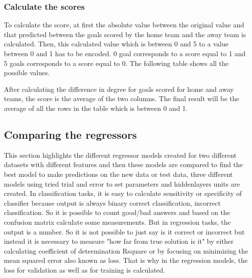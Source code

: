 \subsubsection{Calculate the scores}

To calculate the score, at first the absolute value between the original value 
and that predicted between the goals scored by the home team and the away team is calculated.
Then, this calculated value which is between 0 and 5 to a value between 0 and 1 has to be encoded. 
0 goal corresponds to a score equal to 1 and 5 goals corresponds to a score equal to 0.
The following table shows all the possible values.


\begin{table}[H]
    \centering
    \caption{Calculate the degree difference}
    \label{table:qualitycriteriaround}
\end{table}

After calculating the difference in degree for goals scored for home and away teams, the score is the average of the two columns. The final result will be the average of all the rows in the table which is between 0 and 1.

\subsection{Comparing the regressors}
This section highlights the different regressor models created for two different datasets with different features and then these models are compared to find the best model to make predictions on the new data or test data, three different models using tried trial and error to set parameters and hiddenlayers units are created.\newline 
In classification tasks, it is easy to calculate sensitivity or specificity of classifier because output is always binary {correct classification, incorrect classification}. So it is possible to count good/bad answers and based on the confusion matrix calculate some measurements. But in regression tasks, the output is a number. So it is not possible to just say is it correct or incorrect but instead it is necessary to measure "how far from true solution is it" by either calculating coefficient of determination Rsquare or by focusing on minimizing the mean squared error also known as loss. That is why in the regression models, the loss for validation as well as for training is calculated.
